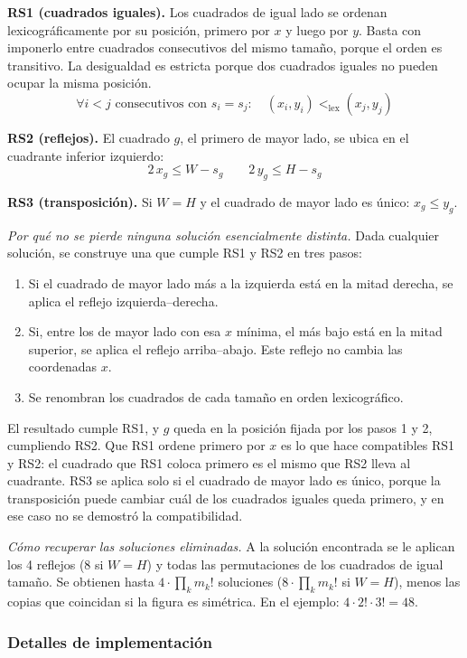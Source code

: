 \textbf{RS1 (cuadrados iguales).} Los cuadrados de igual lado se ordenan lexicográficamente por su posición, primero por $x$ y luego por $y$. Basta con imponerlo entre cuadrados consecutivos del mismo tamaño, porque el orden es transitivo. La desigualdad es estricta porque dos cuadrados iguales no pueden ocupar la misma posición.
\[
    \forall i < j \text{ consecutivos con } s_i = s_j:\quad (x_i, y_i) <_{\mathrm{lex}} (x_j, y_j)
\]

\textbf{RS2 (reflejos).} El cuadrado $g$, el primero de mayor lado, se ubica en el cuadrante inferior izquierdo:
\[
    2\,x_g \le W - s_g \qquad 2\,y_g \le H - s_g
\]

\textbf{RS3 (transposición).} Si $W = H$ y el cuadrado de mayor lado es único: $x_g \le y_g$.

\textit{Por qué no se pierde ninguna solución esencialmente distinta.} Dada cualquier solución, se construye una que cumple RS1 y RS2 en tres pasos:

\begin{enumerate}
    \item Si el cuadrado de mayor lado más a la izquierda está en la mitad derecha, se aplica el reflejo izquierda--derecha.
    \item Si, entre los de mayor lado con esa $x$ mínima, el más bajo está en la mitad superior, se aplica el reflejo arriba--abajo. Este reflejo no cambia las coordenadas $x$.
    \item Se renombran los cuadrados de cada tamaño en orden lexicográfico.
\end{enumerate}

El resultado cumple RS1, y $g$ queda en la posición fijada por los pasos 1 y 2, cumpliendo RS2. Que RS1 ordene primero por $x$ es lo que hace compatibles RS1 y RS2: el cuadrado que RS1 coloca primero es el mismo que RS2 lleva al cuadrante. RS3 se aplica solo si el cuadrado de mayor lado es único, porque la transposición puede cambiar cuál de los cuadrados iguales queda primero, y en ese caso no se demostró la compatibilidad.

\textit{Cómo recuperar las soluciones eliminadas.} A la solución encontrada se le aplican los 4 reflejos (8 si $W = H$) y todas las permutaciones de los cuadrados de igual tamaño. Se obtienen hasta $4 \cdot \prod_k m_k!$ soluciones ($8 \cdot \prod_k m_k!$ si $W = H$), menos las copias que coincidan si la figura es simétrica. En el ejemplo: $4 \cdot 2! \cdot 3! = 48$.

\subsubsection{Detalles de implementación}

